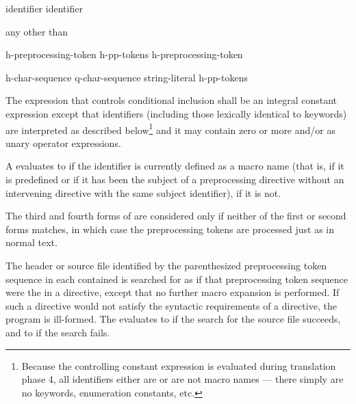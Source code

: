 %
\begin{bnf}
\br
     identifier\br
     identifier \terminal{)}
\end{bnf}

\begin{bnf}
\br
    \textnormal{any  other than \terminal{>}}
\end{bnf}

\begin{bnf}
\br
    h-preprocessing-token\br
    h-pp-tokens h-preprocessing-token
\end{bnf}

%
\begin{bnf}
\br
     h-char-sequence \terminal{> )}\br
     q-char-sequence \br
       string-literal  \terminal{)}\br
     h-pp-tokens     \terminal{> )}
\end{bnf}

\pnum
The expression that controls conditional inclusion
shall be an integral constant expression except that
identifiers
(including those lexically identical to keywords)
are interpreted as described below\footnote{Because the controlling constant expression is evaluated
during translation phase 4,
all identifiers either are or are not macro names ---
there simply are no keywords, enumeration constants, etc.}
and it may contain zero or more  and/or
 as unary operator expressions.

\pnum
A  evaluates to 
if the identifier is currently defined
as a macro name
(that is, if it is predefined
or if it has been the subject of a
preprocessing directive
without an intervening
directive with the same subject identifier),  if it is not.

\pnum
The third and fourth forms of 
are considered only if neither of the first or second forms matches,
in which case the preprocessing tokens are processed just as in normal text.

\pnum
The header or source file identified by
the parenthesized preprocessing token sequence
in each contained 
is searched for as if that preprocessing token sequence
were the  in a  directive,
except that no further macro expansion is performed.
If such a directive would not satisfy the syntactic requirements
of a  directive, the program is ill-formed.
The  evaluates
to  if the search for the source file succeeds, and
to  if the search fails.

